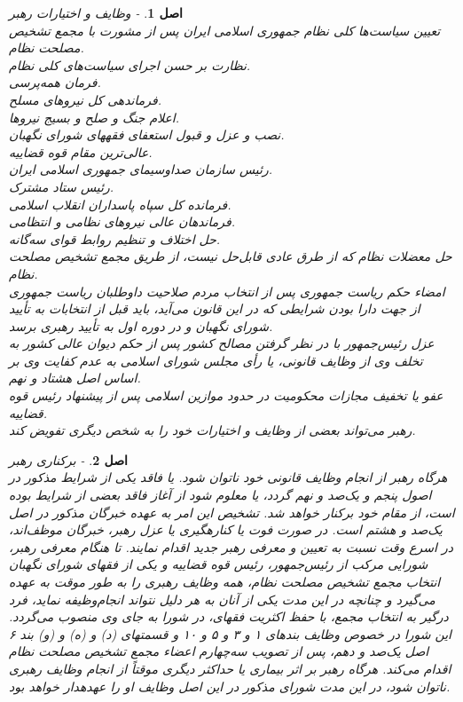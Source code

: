 \documentclass[12pt]{article}
\newtheorem{asl}{اصل}
\begin{document}
\begin{asl}- 
وظایف و اختیارات رهبر
\\
تعیین سیاست‌ها کلی نظام جمهوری اسلامی ایران پس از مشورت با مجمع تشخیص مصلحت نظام. 
\\
نظارت بر حسن اجرای سیاست‌های کلی نظام. 
\\
فرمان همه‌‏پرسی. 
\\
فرماندهی کل نیروهای مسلح. 
\\
اعلام جنگ و صلح و بسیج نیروها.
\\
نصب و عزل و قبول استعفای‏ فقه‏های شورای نگهبان. 
\\
عالی‌ترین مقام قوه قضاییه. 
\\
رئیس سازمان صداوسیمای جمهوری اسلامی ایران. 
\\
رئیس ستاد مشترک. 
\\
فرمانده کل سپاه پاسداران انقلاب اسلامی. 
\\
فرماندهان عالی نیروهای نظامی و انتظامی. 
\\
حل اختلاف و تنظیم روابط قوای سه‌گانه. 
\\
حل معضلات نظام که از طرق عادی قابل‌حل نیست، از طریق مجمع تشخیص مصلحت نظام. 
\\
امضاء حکم ریاست جمهوری پس از انتخاب مردم صلاحیت داوطلبان ریاست جمهوری از جهت دارا بودن شرایطی که در این قانون می‌آید، باید قبل از انتخابات به تأیید شورای نگهبان و در دوره اول به تأیید رهبری برسد. 
\\
عزل رئیس‌جمهور با در نظر گرفتن مصالح کشور پس از حکم دیوان عالی کشور به تخلف وی از وظایف قانونی، یا رأی مجلس شورای اسلامی به عدم کفایت وی بر اساس اصل هشتاد و نهم. 
\\
عفو یا تخفیف مجازات محکومیت در حدود موازین اسلامی پس از پیشنهاد رئیس قوه قضاییه. 
\\
رهبر می‌تواند بعضی از وظایف و اختیارات خود را به شخص دیگری تفویض کند. 
\end{asl}

\begin{asl}- 
برکناری رهبر 
\\
هرگاه رهبر از انجام وظایف قانونی خود ناتوان شود. یا فاقد یکی از شرایط مذکور در اصول پنجم و یک‌صد و نهم گردد، یا معلوم شود از آغاز فاقد بعضی از شرایط بوده است، از مقام خود برکنار خواهد شد. تشخیص این امر به عهده خبرگان مذکور در اصل یک‌صد و هشتم است. در صورت فوت یا کناره‏گیری یا عزل رهبر، خبرگان موظف‌اند، در اسرع وقت نسبت به تعیین و معرفی رهبر جدید اقدام نمایند. تا هنگام معرفی رهبر، شورایی مرکب از رئیس‌جمهور، رئیس قوه قضاییه و یکی از فقهای شورای نگهبان انتخاب مجمع تشخیص مصلحت نظام، همه وظایف رهبری را به طور موقت به عهده می‌گیرد و چنانچه در این مدت یکی از آنان به هر دلیل نتواند انجام‌وظیفه نماید، فرد درگیر به انتخاب مجمع، با حفظ اکثریت فقهای، در شورا به جای وی منصوب می‌گردد. این شورا در خصوص وظایف بندهای ۱ و ۳ و ۵ و ۱۰ و قسمت‏های (د) و (ه) و (و) بند ۶ اصل یک‌صد و دهم، پس از تصویب سه‌چهارم اعضاء مجمع تشخیص مصلحت نظام اقدام می‌کند. هرگاه رهبر بر اثر بیماری یا حداکثر دیگری موقتاً از انجام وظایف رهبری ناتوان شود، در این مدت شورای مذکور در این اصل وظایف او را عهده‏دار خواهد بود. 

\end{asl}
\end{document}

